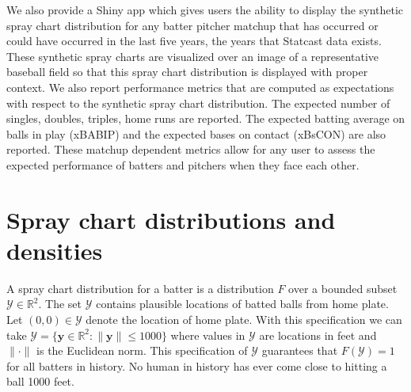 \documentclass[12pt]{article}
\newcommand{\R}{\mathbb{R}}
\newcommand{\Y}{\mathcal{Y}}
\newcommand{\y}{\textbf{y}}
\begin{document}
We also provide a Shiny app which gives users the ability to display the synthetic spray chart distribution for any batter pitcher matchup that has occurred or could have occurred in the last five years, the years that Statcast data exists. These synthetic spray charts are visualized over an image of a representative baseball field so that this spray chart distribution is displayed with proper context. We also report performance metrics that are computed as expectations with respect to the synthetic spray chart distribution. The expected number of singles, doubles, triples, home runs are reported. The expected batting average on balls in play (xBABIP) and the expected bases on contact (xBsCON) are also reported. These matchup dependent metrics allow for any user to assess the expected performance of batters and pitchers when they face each other. 




\section{Spray chart distributions and densities}

A spray chart distribution for a batter is a distribution $F$ over a bounded subset $\Y \in \R^2$. The set $\Y$ contains plausible locations of batted balls from home plate. Let $(0,0) \in \Y$ denote the location of home plate. With this specification we can take $\Y = \{\y \in \R^2: \|\y\| \leq 1000\}$ where values in $\Y$ are locations in feet and $\|\cdot\|$ is the Euclidean norm. This specification of $\Y$ guarantees that $F(\Y) = 1$ for all batters in history. No human in history has ever come close to hitting a ball 1000 feet.
\end{document}
